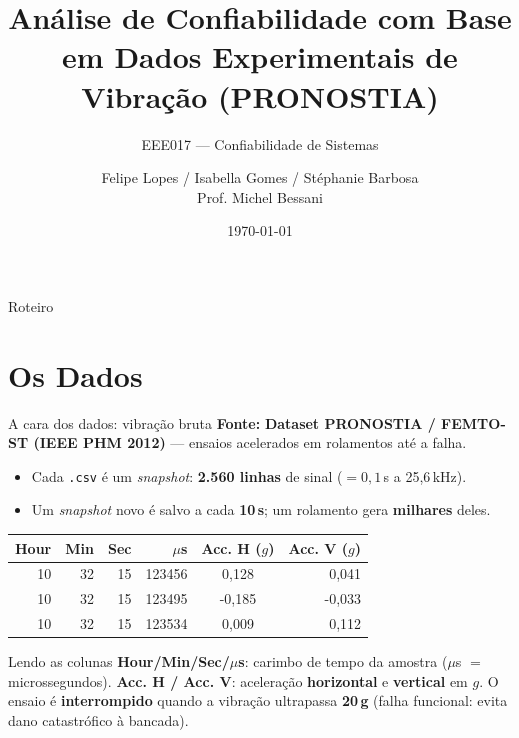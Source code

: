\documentclass{beamer}
\title[Confiabilidade (PRONOSTIA)]{Análise de Confiabilidade com Base em Dados Experimentais de Vibração (PRONOSTIA)}
\subtitle{EEE017 --- Confiabilidade de Sistemas}
\author[Felipe / Isabella / Stéphanie]{Felipe Lopes / Isabella Gomes / Stéphanie Barbosa \\ {\footnotesize Prof. Michel Bessani}}
\institute[UFMG]{Universidade Federal de Minas Gerais}
\date{\today}
\begin{document}
\begin{frame}
    \titlepage
\end{frame}

\begin{frame}{Roteiro}
    \tableofcontents
\end{frame}

\section{Os Dados}

\begin{frame}{A cara dos dados: vibração bruta}
    \textbf{Fonte:} \textbf{Dataset PRONOSTIA / FEMTO-ST (IEEE PHM 2012)} --- ensaios acelerados em rolamentos até a falha.
    \vspace{0.1cm}
    \begin{itemize}
        \item Cada \texttt{.csv} é um \textit{snapshot}: \textbf{2.560 linhas} de sinal ($=0{,}1$\,s a 25,6\,kHz).
        \item Um \textit{snapshot} novo é salvo a cada \textbf{10\,s}; um rolamento gera \textbf{milhares} deles.
    \end{itemize}
    \vspace{0.1cm}
    \footnotesize
    \begin{tabular}{rrrrcr}
        \toprule
        \textbf{Hour} & \textbf{Min} & \textbf{Sec} & \textbf{$\mu$s} & \textbf{Acc. H ($g$)} & \textbf{Acc. V ($g$)} \\
        \midrule
        10 & 32 & 15 & 123456 & 0,128 & 0,041 \\
        10 & 32 & 15 & 123495 & -0,185 & -0,033 \\
        10 & 32 & 15 & 123534 & 0,009 & 0,112 \\
        \bottomrule
    \end{tabular}
    \normalsize
    \vspace{0.15cm}
    \begin{block}{Lendo as colunas}
        \footnotesize \textbf{Hour/Min/Sec/$\mu$s}: carimbo de tempo da amostra ($\mu$s $=$ microssegundos). \textbf{Acc. H / Acc. V}: aceleração \textbf{horizontal} e \textbf{vertical} em $g$. O ensaio é \textbf{interrompido} quando a vibração ultrapassa \textbf{20\,g} (falha funcional: evita dano catastrófico à bancada).
    \end{block}
\end{frame}
\end{document}
